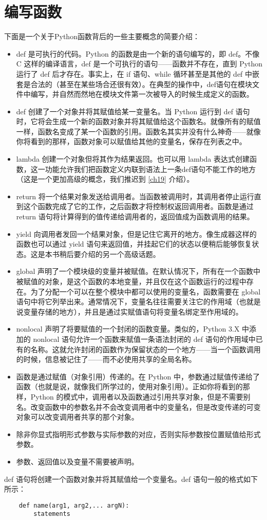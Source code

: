 \section{编写函数}
下面是一个关于Python函数背后的一些主要概念的简要介绍：
\begin{itemize}
    \item def 是可执行的代码。Python 的函数是由一个新的语句编写的，即 def。不像 C 这样的编译语言，def 是一个可执行的语句——函数并不存在，直到 Python 运行了 def 后才存在。事实上，在 if 语句、while 循环甚至是其他的 def 中嵌套是合法的（甚至在某些场合还很有效）。在典型的操作中，def语句在模块文件中编写，并自然而然地在模块文件第一次被导入的时候生成定义的函数。
    \item def 创建了一个对象并将其赋值给某一变量名。当 Python 运行到 def 语句时，它将会生成一个新的函数对象并将其赋值给这个函数名。就像所有的赋值一样，函数名变成了某一个函数的引用。函数名其实并没有什么神奇——就像你将看到的那样，函数对象可以赋值给其他的变量名，保存在列表之中。
    \item lambda 创建一个对象但将其作为结果返回。也可以用 lambda 表达式创建函数，这一功能允许我们把函数定义内联到语法上一条def语句不能工作的地方（这是一个更加高级的概念，我们推迟到 \autoref{ch19} 介绍）。
    \item return 将一个结果对象发送给调用者。当函数被调用时，其调用者停止运行直到这个函数完成了它的工作，之后函数才将控制权返回调用者。函数是通过 return 语句将计算得到的值传递给调用者的，返回值成为函数调用的结果。
    \item yield 向调用者发回一个结果对象，但是记住它离开的地方。像生成器这样的函数也可以通过 yield 语句来返回值，并挂起它们的状态以便稍后能够恢复状态。这是本书稍后要介绍的另一个高级话题。
    \item global 声明了一个模块级的变量并被赋值。在默认情况下，所有在一个函数中被赋值的对象，是这个函数的本地变量，并且仅在这个函数运行的过程中存在。为了分配一个可以在整个模块中都可以使用的变量名，函数需要在 global 语句中将它列举出来。通常情况下，变量名往往需要关注它的作用域（也就是说变量存储的地方），并且是通过实赋值语句将变量名绑定至作用域的。
    \item nonlocal 声明了将要赋值的一个封闭的函数变量。类似的，Python 3.X 中添加的 nonlocal 语句允许一个函数来赋值一条语法封闭的 def 语句的作用域中已有的名称。这就允许封闭的函数作为保留状态的一个地方——当一个函数调用的时候，信息被记住了——而不必使用共享的全局名称。
    \item 函数是通过赋值（对象引用）传递的。在 Python 中，参数通过赋值传递给了函数（也就是说，就像我们所学过的，使用对象引用）。正如你将看到的那样，Python 的模式中，调用者以及函数通过引用共享对象，但是不需要别名。改变函数中的参数名并不会改变调用者中的变量名，但是改变传递的可变对象可以改变调用者共享的那个对象。
    \item 除非你显式指明形式参数与实际参数的对应，否则实际参数按位置赋值给形式参数。
    \item 参数、返回值以及变量不需要被声明。
\end{itemize}
def 语句将创建一个函数对象并将其赋值给一个变量名。def 语句一般的格式如下所示：
\begin{verbatim}
    def name(arg1, arg2,... argN):
        statements
\end{verbatim}


